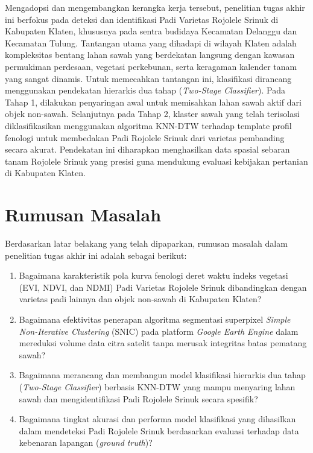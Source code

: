 Mengadopsi dan mengembangkan kerangka kerja tersebut, penelitian tugas akhir ini berfokus pada deteksi dan identifikasi Padi Varietas Rojolele Srinuk di Kabupaten Klaten, khususnya pada sentra budidaya Kecamatan Delanggu dan Kecamatan Tulung. Tantangan utama yang dihadapi di wilayah Klaten adalah kompleksitas bentang lahan sawah yang berdekatan langsung dengan kawasan permukiman perdesaan, vegetasi perkebunan, serta keragaman kalender tanam yang sangat dinamis. Untuk memecahkan tantangan ini, klasifikasi dirancang menggunakan pendekatan hierarkis dua tahap (\textit{Two-Stage Classifier}). Pada Tahap 1, dilakukan penyaringan awal untuk memisahkan lahan sawah aktif dari objek non-sawah. Selanjutnya pada Tahap 2, klaster sawah yang telah terisolasi diklasifikasikan menggunakan algoritma KNN-DTW terhadap template profil fenologi untuk membedakan Padi Rojolele Srinuk dari varietas pembanding secara akurat. Pendekatan ini diharapkan menghasilkan data spasial sebaran tanam Rojolele Srinuk yang presisi guna mendukung evaluasi kebijakan pertanian di Kabupaten Klaten.

\section{Rumusan Masalah}
\label{sec:rumusan_masalah}

Berdasarkan latar belakang yang telah dipaparkan, rumusan masalah dalam penelitian tugas akhir ini adalah sebagai berikut:
\begin{enumerate}
    \item Bagaimana karakteristik pola kurva fenologi deret waktu indeks vegetasi (EVI, NDVI, dan NDMI) Padi Varietas Rojolele Srinuk dibandingkan dengan varietas padi lainnya dan objek non-sawah di Kabupaten Klaten?
    \item Bagaimana efektivitas penerapan algoritma segmentasi superpixel \textit{Simple Non-Iterative Clustering} (SNIC) pada platform \textit{Google Earth Engine} dalam mereduksi volume data citra satelit tanpa merusak integritas batas pematang sawah?
    \item Bagaimana merancang dan membangun model klasifikasi hierarkis dua tahap (\textit{Two-Stage Classifier}) berbasis KNN-DTW yang mampu menyaring lahan sawah dan mengidentifikasi Padi Rojolele Srinuk secara spesifik?
    \item Bagaimana tingkat akurasi dan performa model klasifikasi yang dihasilkan dalam mendeteksi Padi Rojolele Srinuk berdasarkan evaluasi terhadap data kebenaran lapangan (\textit{ground truth})?
\end{enumerate}

